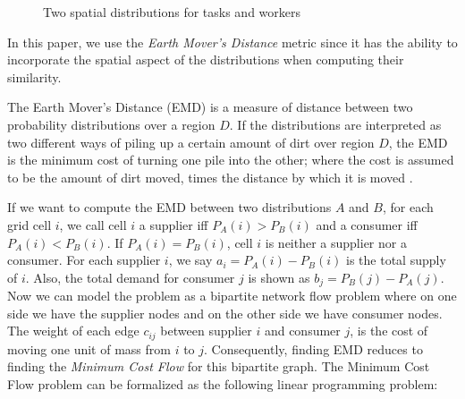 \begin{figure}[t]
    \centering
    \vspace{-0.1in}
    \caption{Two spatial distributions for tasks and workers}
    \label{fig:sdist}
\end{figure}

In this paper, we use the \textit{Earth Mover's Distance} metric since it has the ability to incorporate the spatial aspect of the distributions when computing their similarity.

\begin{definition}
The Earth Mover's Distance (EMD) is a measure of distance between two probability distributions over a region $D$. If the distributions are interpreted as two different ways of piling up a certain amount of dirt over region $D$, the EMD is the minimum cost of turning one pile into the other; where the cost is assumed to be the amount of dirt moved, times the distance by which it is moved \cite{Rubner98}.
\end{definition}

If we want to compute the EMD between two distributions $A$ and $B$, for each grid cell $i$, we call cell $i$ a supplier iff $P_A(i) > P_B(i)$ and a consumer iff $P_A(i) < P_B(i)$. If $P_A(i) = P_B(i)$, cell $i$ is neither a supplier nor a consumer. For each supplier $i$, we say $a_i = P_A(i) - P_B(i)$ is the total supply of $i$. Also, the total demand for consumer $j$ is shown as $b_j = P_B(j) - P_A(j)$. Now we can model the problem as a bipartite network flow problem where on one side we have the supplier nodes and on the other side we have consumer nodes. The weight of each edge $c_{ij}$ between supplier $i$ and consumer $j$, is the cost of moving one unit of mass from $i$ to $j$.  Consequently, finding EMD reduces to finding the \textit{Minimum Cost Flow} for this bipartite graph. The Minimum Cost Flow problem can be formalized as the following linear programming problem:


